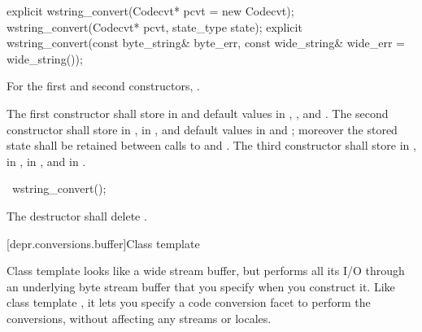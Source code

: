 %
\begin{itemdecl}
explicit wstring_convert(Codecvt* pcvt = new Codecvt);
wstring_convert(Codecvt* pcvt, state_type state);
explicit wstring_convert(const byte_string& byte_err,
    const wide_string& wide_err = wide_string());
\end{itemdecl}

\begin{itemdescr}
\pnum
\requires
For the first and second constructors, .

\pnum
\effects
The first constructor shall store  in  and
default values in , , and
.
The second constructor shall store  in ,
 in , and default values in
 and ; moreover the
stored state shall be retained between calls to  and
.
The third constructor shall store  in ,
 in , 
in , and  in
.
\end{itemdescr}

%
\begin{itemdecl}
~wstring_convert();
\end{itemdecl}

\begin{itemdescr}
\pnum
\effects The destructor shall delete .
\end{itemdescr}

[depr.conversions.buffer]{Class template }

\pnum
Class template  looks like a wide stream buffer, but
performs all its I/O through an underlying byte stream buffer that you
specify when you construct it. Like class template , it
lets you specify a code conversion facet to perform the conversions,
without affecting any streams or locales.

